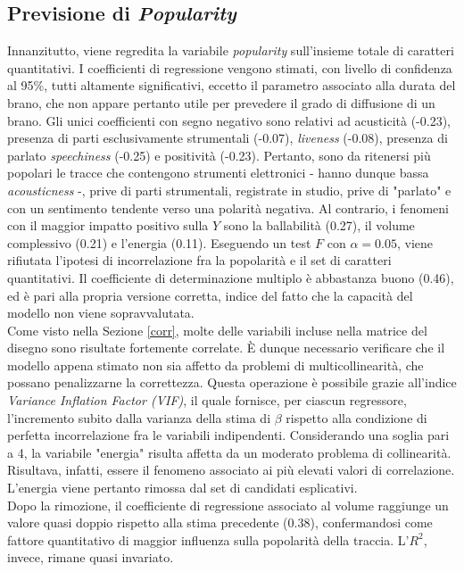 \documentclass[fleqn,10pt]{SelfArx} %
\begin{document}
\subsection{Previsione di \textit{Popularity}}
Innanzitutto, viene regredita la variabile \textit{popularity} sull'insieme totale di caratteri quantitativi. I coefficienti di regressione vengono stimati, con livello di confidenza al 95\%, tutti altamente significativi, eccetto il parametro associato alla durata del brano, che non appare pertanto utile per prevedere il grado di diffusione di un brano. Gli unici coefficienti con segno negativo sono relativi ad acusticità (-0.23), presenza di parti esclusivamente strumentali (-0.07), \textit{liveness} (-0.08), presenza di parlato \textit{speechiness} (-0.25) e positività (-0.23). Pertanto, sono da ritenersi più popolari le tracce che contengono strumenti elettronici - hanno dunque bassa \textit{acousticness} -, prive di parti strumentali, registrate in studio, prive di "parlato" e con un sentimento tendente verso una polarità negativa. Al contrario, i fenomeni con il maggior impatto positivo sulla $Y$ sono la ballabilità (0.27), il volume complessivo (0.21) e l'energia (0.11). Eseguendo un test $F$ con $\alpha=0.05$, viene rifiutata l'ipotesi di incorrelazione fra la popolarità e il set di caratteri quantitativi. Il coefficiente di determinazione multiplo è abbastanza buono (0.46), ed è pari alla propria versione corretta, indice del fatto che la capacità del modello non viene sopravvalutata.\\
Come visto nella Sezione \ref{corr}, molte delle variabili incluse nella matrice del disegno sono risultate fortemente correlate. È dunque necessario verificare che il modello appena stimato non sia affetto da problemi di multicollinearità, che possano penalizzarne la correttezza. Questa operazione è possibile grazie all'indice \textit{Variance Inflation Factor (VIF)}, il quale fornisce, per ciascun regressore, l'incremento subito dalla varianza della stima di $\beta$ rispetto alla condizione di perfetta incorrelazione fra le variabili indipendenti. Considerando una soglia pari a 4, la variabile "energia" risulta affetta da un moderato problema di collinearità. Risultava, infatti, essere il fenomeno associato ai più elevati valori di correlazione. L'energia viene pertanto rimossa dal set di candidati esplicativi.\\
Dopo la rimozione, il coefficiente di regressione associato al volume raggiunge un valore quasi doppio rispetto alla stima precedente (0.38), confermandosi come fattore quantitativo di maggior influenza sulla popolarità della traccia. L'$R^2$, invece, rimane quasi invariato.\\
\end{document}
